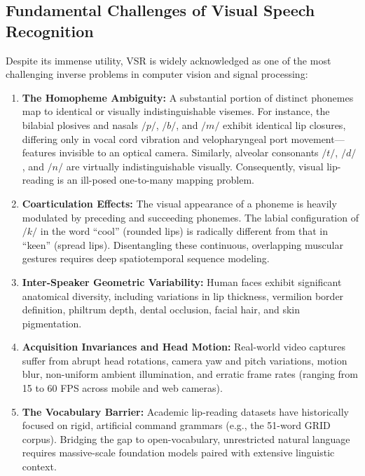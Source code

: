 \documentclass[conference,compsoc,10pt]{IEEEtran}
\begin{document}
\subsection{Fundamental Challenges of Visual Speech Recognition}
Despite its immense utility, VSR is widely acknowledged as one of the most challenging inverse problems in computer vision and signal processing:
\begin{enumerate}
    \item \textbf{The Homopheme Ambiguity:} A substantial portion of distinct phonemes map to identical or visually indistinguishable visemes. For instance, the bilabial plosives and nasals $/p/$, $/b/$, and $/m/$ exhibit identical lip closures, differing only in vocal cord vibration and velopharyngeal port movement---features invisible to an optical camera. Similarly, alveolar consonants $/t/$, $/d/$, and $/n/$ are virtually indistinguishable visually. Consequently, visual lip-reading is an ill-posed one-to-many mapping problem.
    \item \textbf{Coarticulation Effects:} The visual appearance of a phoneme is heavily modulated by preceding and succeeding phonemes. The labial configuration of $/k/$ in the word ``cool'' (rounded lips) is radically different from that in ``keen'' (spread lips). Disentangling these continuous, overlapping muscular gestures requires deep spatiotemporal sequence modeling.
    \item \textbf{Inter-Speaker Geometric Variability:} Human faces exhibit significant anatomical diversity, including variations in lip thickness, vermilion border definition, philtrum depth, dental occlusion, facial hair, and skin pigmentation.
    \item \textbf{Acquisition Invariances and Head Motion:} Real-world video captures suffer from abrupt head rotations, camera yaw and pitch variations, motion blur, non-uniform ambient illumination, and erratic frame rates (ranging from 15 to 60 FPS across mobile and web cameras).
    \item \textbf{The Vocabulary Barrier:} Academic lip-reading datasets have historically focused on rigid, artificial command grammars (e.g., the 51-word GRID corpus). Bridging the gap to open-vocabulary, unrestricted natural language requires massive-scale foundation models paired with extensive linguistic context.
\end{enumerate}
\end{document}
